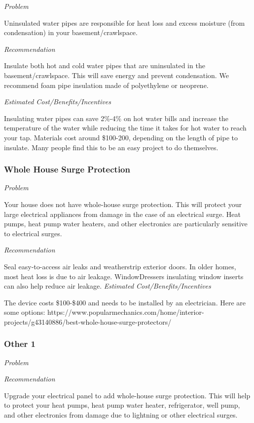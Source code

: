 \documentclass[
  letterpaper,
  DIV=11,
  numbers=noendperiod]{scrartcl}
\begin{document}
\emph{Problem}

Uninsulated water pipes are responsible for heat loss and excess
moisture (from condensation) in your basement/crawlspace.

\emph{Recommendation}

Insulate both hot and cold water pipes that are uninsulated in the
basement/crawlspace. This will save energy and prevent condensation. We
recommend foam pipe insulation made of polyethylene or neoprene.

\emph{Estimated Cost/Benefits/Incentives}

Insulating water pipes can save 2\%-4\% on hot water bills and increase
the temperature of the water while reducing the time it takes for hot
water to reach your tap. Materials cost around \$100-200, depending on
the length of pipe to insulate. Many people find this to be an easy
project to do themselves.

\subsubsection{Whole House Surge
Protection}\label{whole-house-surge-protection}

\emph{Problem}

Your house does not have whole-house surge protection. This will protect
your large electrical appliances from damage in the case of an
electrical surge. Heat pumps, heat pump water heaters, and other
electronics are particularly sensitive to electrical surges.

\emph{Recommendation}

Seal easy-to-access air leaks and weatherstrip exterior doors. In older
homes, most heat loss is due to air leakage. WindowDressers insulating
window inserts can also help reduce air leakage. \emph{Estimated
Cost/Benefits/Incentives}

The device costs \$100-\$400 and needs to be installed by an
electrician. Here are some options:
https://www.popularmechanics.com/home/interior-projects/g43140886/best-whole-house-surge-protectors/

\subsubsection{Other 1}\label{other-1}

\emph{Problem}

\emph{Recommendation}

Upgrade your electrical panel to add whole-house surge protection. This
will help to protect your heat pumps, heat pump water heater,
refrigerator, well pump, and other electronics from damage due to
lightning or other electrical surges.
\end{document}
